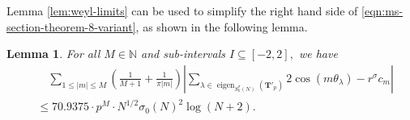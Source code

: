 \documentclass[11pt,letterpaper,reqno]{amsart}
\newtheorem{lemma}[theorem]{Lemma}
\theoremstyle{definition}
\numberwithin{equation}{section}
\numberwithin{figure}{section}
\numberwithin{table}{section}
\newcommand{\eigen}{\operatorname{eigen}}
\begin{document}
Lemma \ref{lem:weyl-limits} can be used to simplify the right hand side of \eqref{eqn:ms-section-theorem-8-variant}, as shown in the following lemma.

\begin{lemma}\label{lem:sum-upper-bound}
    For all $M \in \mathbb{N}$ and sub-intervals $I \subseteq [-2, 2],$ we have
    \begin{align}
    &\quad \sum_{1 \leq |m| \leq M} \left( \frac{1}{M + 1} + \frac{1}{\pi|m|} \right) \left| \sum_{\lambda \in \eigen_{S_k^\sigma(N)}(\mathbf{T}'_p)}  2\cos\left(m \theta_\lambda \right) - r^\sigma c_m \right| \label{eqn:sum-from-lemma-sum-upper-bound}\\
    &\le 70.9375 \cdot p^M \cdot N^{1/2} \sigma_0(N)^2\log(N + 2).
    \end{align}
\end{lemma}
\end{document}
